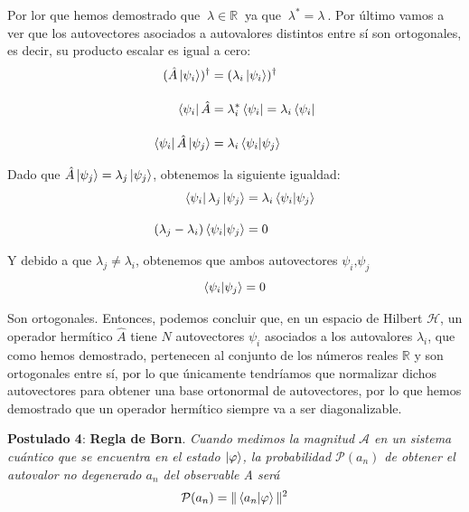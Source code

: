 \documentclass{article}
\numberwithin{equation}{section} %
\begin{document}
    Por lor que hemos demostrado que \( \ \lambda \in \mathbb{R} \ \) ya que \( \ \lambda ^ {*} = \lambda \ \). Por último vamos a ver que los autovectores asociados a autovalores distintos entre sí son ortogonales, es decir, su producto escalar es igual a cero:
    \begin{align*}
        (\hat{A} \ket{\psi_{i}})^{\dagger} &= (\lambda_{i} \ket{\psi_{i}})^{\dagger} \\[10pt]
        \bra{\psi_{i}} \hat{A} &= \lambda_{i}^{*} \bra{\psi_{i}} = \lambda_{i} \bra{\psi_{i}} \\[10pt]
        \bra{\psi_{i}} \hat{A} \ket{\psi_{j}} &= \lambda_{i} \braket{\psi_{i} | \psi_{j}}
    \end{align*}

    Dado que \( \hat{A} \ket{\psi_{j}} = \lambda_{j} \ket{\psi_{j}} \), obtenemos la siguiente igualdad:
    \begin{align*}
        \bra{\psi_{i}} \lambda_{j} \ket{\psi_{j}} &= \lambda_{i} \braket{\psi_{i} | \psi_{j}} \\[10pt]
        ( \lambda_{j} - \lambda_{i} ) \braket{\psi_{i} | \psi_{j}} &= 0
    \end{align*}

    Y debido a que \( \lambda_{j} \neq \lambda_{i} \), obtenemos que ambos autovectores \( \psi_{i} \text{,} \psi_{j} \)
    \begin{equation}
        \braket{\psi_{i} | \psi_{j}} = 0
    \end{equation}

    Son ortogonales. Entonces, podemos concluir que, en un espacio de Hilbert \( \mathcal{H} \), un operador hermítico \( \hat{A} \) tiene \( N \) autovectores \( \psi_{i} \) asociados a los autovalores \( \lambda_{i} \), que como hemos demostrado, pertenecen al conjunto de los números reales \( \mathbb{R} \) y son ortogonales entre sí, por lo que únicamente tendríamos que normalizar dichos autovectores para obtener una base ortonormal de autovectores, por lo que hemos demostrado que un operador hermítico siempre va a ser diagonalizable. 

    \vspace{7.5mm}

    \textbf{Postulado 4}: \textbf{Regla de Born}. \textit{Cuando medimos la magnitud \( \mathcal{A} \) en un sistema
    cuántico que se encuentra en el estado \( \ket{\varphi} \), la probabilidad \( \mathcal{P}(a_{n})\) de obtener el
    autovalor no degenerado \( a_{n}\) del observable A será}
    \begin{equation}
        \mathcal{P}(a_{n}) = \| \braket{a_{n} | \varphi} \| ^{2}
    \end{equation}
\end{document}
